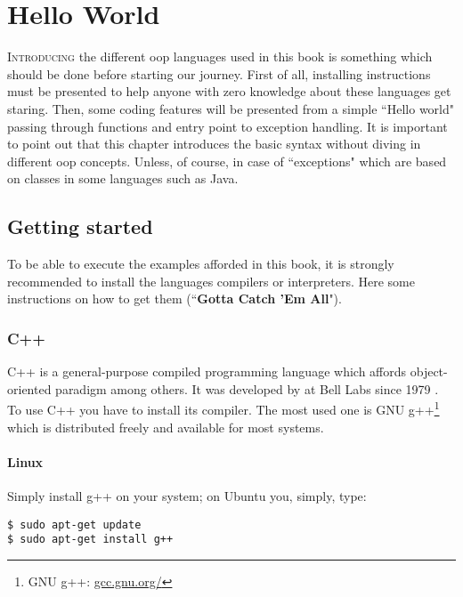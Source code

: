 \documentclass{KodeBook}
\begin{document}
\fi

\chapter{Hello World}

\begin{introduction}
	 
	\lettrine{I}{ntroducing} the different \ac{oop} languages used in this book is something which should be done before starting our journey.
	First of all, installing instructions must be presented to help anyone with zero knowledge about these languages get staring. 
	Then, some coding features will be presented from a simple ``Hello world" passing through functions and entry point to exception handling. 
	It is important to point out that this chapter introduces the basic syntax without diving in different \ac{oop} concepts.
	Unless, of course, in case of ``exceptions" which are based on classes in some languages such as Java.
\end{introduction}


\section{Getting started}

To be able to execute the examples afforded in this book, it is strongly recommended to install the languages compilers or interpreters.
Here some instructions on how to get them (``\textbf{Gotta Catch 'Em All}").

\subsection{C++}


C++ is a general-purpose compiled programming language which affords object-oriented paradigm among others. 
It was developed by  at Bell Labs since 1979 \citep{1993-stroustrup}.
To use C++ you have to install its compiler. 
The most used one is GNU g++\footnote{GNU g++: \url{gcc.gnu.org/}} which is distributed freely and available for most systems.

\subsubsection{Linux}
Simply install g++ on your system; on Ubuntu you, simply, type:
\begin{lstlisting}[style=shellStyle]
$ sudo apt-get update
$ sudo apt-get install g++
\end{lstlisting}
\end{document}
